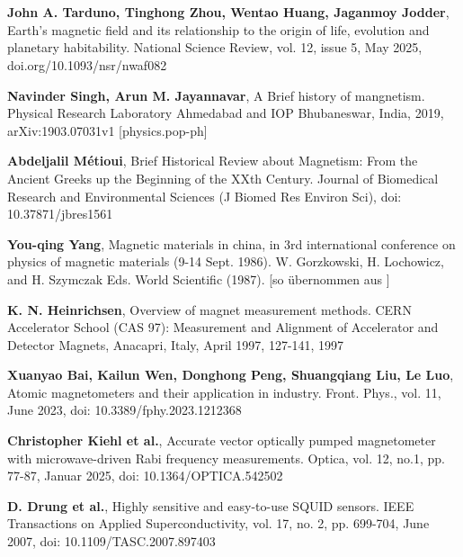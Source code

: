 \documentclass[12pt, a4paper]{article}
\begin{document}
	\section*{%
		}	%
	\newpage
	\begin{thebibliography}{}
		
		\textbf{John A. Tarduno, Tinghong Zhou, Wentao Huang, Jaganmoy Jodder}, Earth’s magnetic field and its relationship to the origin of
		life, evolution and planetary habitability. National Science Review, vol. 12, issue 5, May 2025, doi.org/10.1093/nsr/nwaf082 
		
		\textbf{Navinder Singh, Arun M. Jayannavar}, A Brief history of mangnetism. Physical Research Laboratory Ahmedabad and IOP Bhubaneswar, India, 2019, arXiv:1903.07031v1 [physics.pop-ph]
		
		\textbf{Abdeljalil Métioui}, Brief Historical Review about
		Magnetism: From the Ancient Greeks up the Beginning of the XXth Century. Journal of Biomedical Research and Environmental Sciences (J Biomed Res Environ Sci), doi: 10.37871/jbres1561
		
		\textbf{You-qing Yang}, Magnetic materials in china, in 3rd international conference on physics of magnetic materials (9-14 Sept. 1986). W. Gorzkowski, H. Lochowicz, and H. Szymczak Eds. World Scientific (1987). [so übernommen aus \cite{singh19}]
		
		
		
		
		
		\textbf{K. N. Heinrichsen}, Overview of magnet measurement methods. CERN Accelerator School (CAS 97): Measurement and Alignment of Accelerator and Detector Magnets, Anacapri, Italy, April 1997, 127-141, 1997
		
		\textbf{Xuanyao Bai, Kailun Wen, Donghong Peng, Shuangqiang Liu, Le Luo}, Atomic magnetometers and their application in industry. Front. Phys., vol. 11, June 2023, doi: 10.3389/fphy.2023.1212368
		
		\textbf{Christopher Kiehl et al.}, Accurate vector optically pumped magnetometer with microwave-driven Rabi frequency measurements. Optica, vol. 12, no.1, pp. 77-87, Januar 2025, doi: 10.1364/OPTICA.542502
		
		\textbf{D. Drung et al.}, Highly sensitive and easy-to-use SQUID sensors. IEEE Transactions on Applied Superconductivity, vol. 17, no. 2, pp. 699-704, June 2007, doi: 10.1109/TASC.2007.897403
		

\end{thebibliography}
\end{document}
